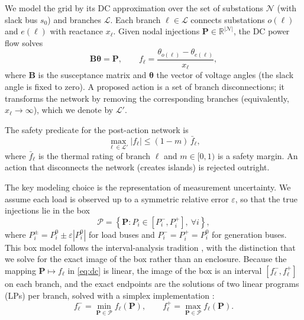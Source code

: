 \documentclass[journal]{IEEEtran}
\begin{document}
We model the grid by its DC approximation over the set of substations
$\mathcal{N}$ (with slack bus $s_0$) and branches $\mathcal{L}$. Each branch
$\ell \in \mathcal{L}$ connects substations $o(\ell)$ and $e(\ell)$ with
reactance $x_\ell$. Given nodal injections $\mathbf{P} \in \mathbb{R}^{|\mathcal{N}|}$,
the DC power flow solves
\begin{equation}
\mathbf{B}\boldsymbol{\theta} = \mathbf{P},\qquad
f_\ell = \frac{\theta_{o(\ell)} - \theta_{e(\ell)}}{x_\ell},
\label{eq:dc}
\end{equation}
where $\mathbf{B}$ is the susceptance matrix and $\boldsymbol{\theta}$ the vector
of voltage angles (the slack angle is fixed to zero). A proposed action is a set
of branch disconnections; it transforms the network by removing the corresponding
branches (equivalently, $x_\ell \to \infty$), which we denote by $\mathcal{L}'$.

The safety predicate for the post-action network is
\begin{equation}
\max_{\ell \in \mathcal{L}'} |f_\ell| \le (1 - m) \, \bar f_\ell,
\label{eq:safety}
\end{equation}
where $\bar f_\ell$ is the thermal rating of branch $\ell$ and $m \in [0,1)$ is a
safety margin. An action that disconnects the network (creates islands) is
rejected outright.

The key modeling choice is the representation of measurement uncertainty. We
assume each load is observed up to a symmetric relative error $\varepsilon$,
so that the true injections lie in the box
\begin{equation}
\mathcal{P} = \left\{ \mathbf{P} : P_i \in [P_i^-, P_i^+],\ \forall i \right\},
\label{eq:box}
\end{equation}
where $P_i^\pm = P_i^0 \pm \varepsilon |P_i^0|$ for load buses and
$P_i^- = P_i^+ = P_i^0$ for generation buses. This box model follows the
interval-analysis tradition \cite{moore2009}, with the distinction that we solve
for the exact image of the box rather than an enclosure. Because the mapping
$\mathbf{P} \mapsto f_\ell$ in \eqref{eq:dc} is linear, the image of the box is an
interval $[f_\ell^-, f_\ell^+]$ on each branch, and the exact endpoints are the
solutions of two linear programs (LPs) per branch, solved with a simplex
implementation \cite{huangfu2018}:
\begin{equation}
f_\ell^- = \min_{\mathbf{P} \in \mathcal{P}} f_\ell(\mathbf{P}),\qquad
f_\ell^+ = \max_{\mathbf{P} \in \mathcal{P}} f_\ell(\mathbf{P}).
\label{eq:lp}
\end{equation}
\end{document}
